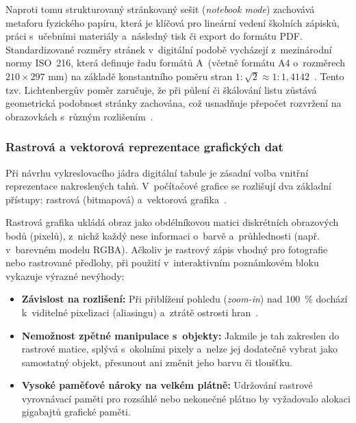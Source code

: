 \documentclass[12pt, a4paper, oneside]{article}
\begin{document}
Naproti tomu strukturovaný stránkovaný sešit (\textit{notebook mode}) zachovává metaforu fyzického papíru, která je klíčová pro lineární vedení školních zápisků, práci s~učebními materiály a~následný tisk či export do formátu PDF. Standardizované rozměry stránek v~digitální podobě vycházejí z~mezinárodní normy ISO~216, která definuje řadu formátů A~(včetně formátu A4 o~rozměrech $210 \times 297\text{~mm}$) na základě konstantního poměru stran $1 : \sqrt{2} \approx 1 : 1{,}4142$~\cite{iso216}. Tento tzv. Lichtenbergův poměr zaručuje, že při půlení či škálování listu zůstává geometrická podobnost stránky zachována, což usnadňuje přepočet rozvržení na obrazovkách s~různým rozlišením~\cite{iso216}.

\subsubsection{Rastrová a vektorová reprezentace grafických dat}
\label{sec:teorie_rastr_vektor}

Při návrhu vykreslovacího jádra digitální tabule je zásadní volba vnitřní reprezentace nakreslených tahů. V~počítačové grafice se rozlišují dva základní přístupy: rastrová (bitmapová) a~vektorová grafika~\cite{marschner2021cg}.

Rastrová grafika ukládá obraz jako obdélníkovou matici diskrétních obrazových bodů (pixelů), z~nichž každý nese informaci o~barvě a~průhlednosti (např. v~barevném modelu RGBA). Ačkoliv je rastrový zápis vhodný pro fotografie nebo rastrované předlohy, při použití v~interaktivním poznámkovém bloku vykazuje výrazné nevýhody:
\begin{itemize}
    \item \textbf{Závislost na rozlišení:} Při přiblížení pohledu (\textit{zoom-in}) nad 100~\% dochází k~viditelné pixelizaci (aliasingu) a~ztrátě ostrosti hran~\cite{marschner2021cg}.
    \item \textbf{Nemožnost zpětné manipulace s~objekty:} Jakmile je tah zakreslen do rastrové matice, splývá s~okolními pixely a~nelze jej dodatečně vybrat jako samostatný objekt, přesunout ani změnit jeho barvu či tloušťku.
    \item \textbf{Vysoké paměťové nároky na velkém plátně:} Udržování rastrové vyrovnávací paměti pro rozsáhlé nebo nekonečné plátno by vyžadovalo alokaci gigabajtů grafické paměti.
\end{itemize}
\end{document}
